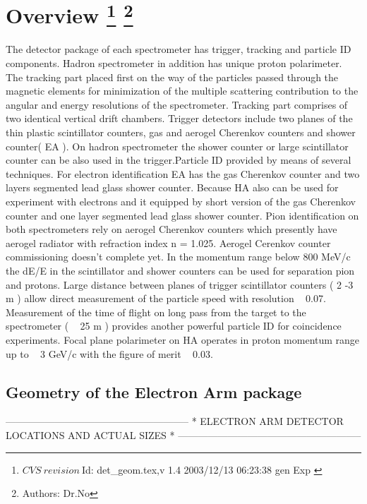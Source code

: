 \section[Overview]{Overview
\footnote{
  $CVS~revision~ $Id: det_geom.tex,v 1.4 2003/12/13 06:23:38 gen Exp $ $
}
\footnote{Authors: Dr.No }
}

        The detector package of each spectrometer has trigger, tracking and particle 
ID components. Hadron spectrometer in addition has unique proton polarimeter. The 
tracking part placed first on the way of the particles passed through the magnetic 
elements for minimization of the multiple scattering contribution to the angular and 
energy resolutions of the spectrometer. Tracking part comprises of 
two identical vertical drift chambers. Trigger detectors include two planes of the
thin plastic scintillator counters, gas and aerogel Cherenkov counters and shower 
counter( EA ). On hadron spectrometer the shower counter or large scintillator counter 
can be also used in the trigger.Particle ID provided by means of several techniques. 
For electron identification EA has the gas Cherenkov counter and two layers segmented 
lead glass shower counter. Because HA also can be used for experiment with electrons 
and it equipped by short version of the gas Cherenkov counter and one layer segmented 
lead glass shower counter. Pion identification on both spectrometers rely on aerogel 
Cherenkov counters which presently have aerogel radiator with refraction index n = 1.025. 
Aerogel Cerenkov counter commissioning doesn't complete yet. In the momentum range 
below 800 MeV/c the dE/E in the scintillator and shower counters can be used for 
separation pion and protons. Large distance between planes of trigger scintillator 
counters ( 2 -3 m ) allow direct measurement of the particle speed with resolution 
~ 0.07. Measurement of the time of flight on long pass from the target to the 
spectrometer ( ~ 25 m ) provides another powerful particle ID for coincidence experiments.
Focal plane polarimeter on HA operates in proton momentum range up to ~ 3 GeV/c with 
the figure of merit ~ 0.03.

\subsection{Geometry of the Electron Arm package}

          --------------------------------------------------------
          *   ELECTRON ARM DETECTOR LOCATIONS AND ACTUAL SIZES   *
          --------------------------------------------------------

